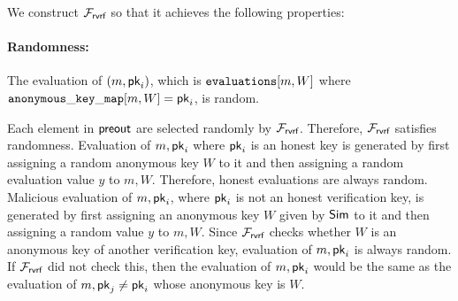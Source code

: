 %
%
We construct $ \mathcal{F}_{\textsf{rvrf}} $ so that it achieves the following properties:

\paragraph{Randomness:}  The evaluation of $ (m, \mathsf{pk}_i) $,  which is $ \texttt{evaluations}[m,W] $ where $ \mathtt{anonymous\_key\_map}[m,W] = \mathsf{pk}_i $, is random.


Each element in $ {\mathsf{preout}} $ are selected randomly by $ \mathcal{F}_{\textsf{rvrf}} $. Therefore, $ \mathcal{F}_{\textsf{rvrf}} $ satisfies randomness.  Evaluation of $ m, \mathsf{pk}_i $ where $ \mathsf{pk}_i $ is an honest key is generated by first assigning a random anonymous key $ W $ to it and then assigning a random evaluation value $ y $ to $ m, W $. Therefore, honest evaluations are always random. Malicious evaluation of $ m, \mathsf{pk}_i $, where $ \mathsf{pk}_i $ is not an honest verification key, is generated by first assigning an anonymous key $ W $ given by $ \mathsf{Sim} $ to it and then assigning a random value $ y $ to $ m, W $. Since $ \mathcal{F}_{\textsf{rvrf}} $ checks whether $ W $ is an anonymous key of another verification key, evaluation of $ m, \mathsf{pk}_i $ is always random. If $ \mathcal{F}_{\textsf{rvrf}} $ did not check this, then the evaluation of $ m, \mathsf{pk}_i $ would be the same as the evaluation of $ m, \mathsf{pk}_j  \neq \mathsf{pk}_i$ whose anonymous key is $ W $.





